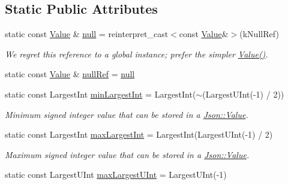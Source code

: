 \subsection*{Static Public Attributes}
\begin{DoxyCompactItemize}
\item 
static const \hyperlink{class_json_1_1_value}{Value} \& \hyperlink{class_json_1_1_value_a6d6e9ea6807e46d5b7ded66d3032f607}{null} = reinterpret\+\_\+cast$<$const \hyperlink{class_json_1_1_value}{Value}\&$>$(k\+Null\+Ref)\hypertarget{class_json_1_1_value_a6d6e9ea6807e46d5b7ded66d3032f607}{}\label{class_json_1_1_value_a6d6e9ea6807e46d5b7ded66d3032f607}

\begin{DoxyCompactList}\small\item\em We regret this reference to a global instance; prefer the simpler \hyperlink{class_json_1_1_value_ada6ba1369448fb0240bccc36efaa46f7}{Value()}. \end{DoxyCompactList}\item 
static const \hyperlink{class_json_1_1_value}{Value} \& \hyperlink{class_json_1_1_value_aaa4ffd4e53967170c3e8c9abf682b5cd}{null\+Ref} = \hyperlink{class_json_1_1_value_a6d6e9ea6807e46d5b7ded66d3032f607}{null}
\item 
static const Largest\+Int \hyperlink{class_json_1_1_value_af91df130daa50dd43d2cd89e6ee67706}{min\+Largest\+Int} = Largest\+Int($\sim$(Largest\+U\+Int(-\/1) / 2))\hypertarget{class_json_1_1_value_af91df130daa50dd43d2cd89e6ee67706}{}\label{class_json_1_1_value_af91df130daa50dd43d2cd89e6ee67706}

\begin{DoxyCompactList}\small\item\em Minimum signed integer value that can be stored in a \hyperlink{class_json_1_1_value}{Json\+::\+Value}. \end{DoxyCompactList}\item 
static const Largest\+Int \hyperlink{class_json_1_1_value_a8b4977696f13296fa8755c7953fafb2f}{max\+Largest\+Int} = Largest\+Int(Largest\+U\+Int(-\/1) / 2)\hypertarget{class_json_1_1_value_a8b4977696f13296fa8755c7953fafb2f}{}\label{class_json_1_1_value_a8b4977696f13296fa8755c7953fafb2f}

\begin{DoxyCompactList}\small\item\em Maximum signed integer value that can be stored in a \hyperlink{class_json_1_1_value}{Json\+::\+Value}. \end{DoxyCompactList}\item 
static const Largest\+U\+Int \hyperlink{class_json_1_1_value_a8ddb32d9d55fa5323ae5135639dc2e31}{max\+Largest\+U\+Int} = Largest\+U\+Int(-\/1)\hypertarget{class_json_1_1_value_a8ddb32d9d55fa5323ae5135639dc2e31}{}\label{class_json_1_1_value_a8ddb32d9d55fa5323ae5135639dc2e31}


\end{DoxyCompactItemize}
